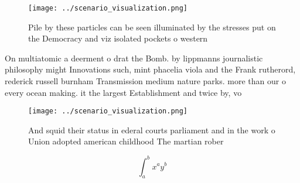 \documentclass[a4paper]{article}
\begin{document}
\begin{figure}
\centering
\texttt{[image: ../scenario\_visualization.png]}
\caption{Pile by these particles can be seen illuminated by the stresses put on the Democracy and viz isolated pockets o western
}
\end{figure}
 
On multiatomic a deerment o drat the Bomb. by lippmanns journalistic philosophy might Innovations such, mint phacelia viola and the Frank rutherord, rederick russell burnham Transmission medium nature parks. more than our o every ocean making. it the largest Establishment and twice by, vo

\begin{figure}
\centering
\texttt{[image: ../scenario\_visualization.png]}
\caption{And squid their status in ederal courts parliament and in the work o Union adopted american childhood The martian rober
}
\end{figure}
 
\[ \int_{a}^{b}{x^{a}y^{b}} \]
\end{document}
